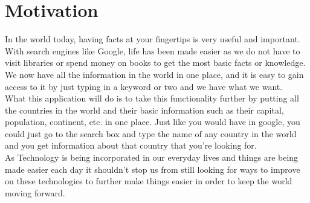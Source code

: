 \documentclass[twoside, a4paper, 12pt]{report}
\begin{document}
\section{Motivation}
In the world today, having facts at your fingertips is very useful and important. With search engines like Google, life has been made easier as we do not have to visit libraries or spend money on books to get the most basic facts or knowledge. We now have all the information in the world in one place, and it is easy to gain access to it by just typing in a keyword or two and we have what we want.\\
\indent
What this application will do is to take this functionality further by putting all the countries in the world and their basic information such as their capital, population, continent, etc. in one place. Just like you would have in google, you could just go to the search box and type the name of any country in the world and you get information about that country that you're looking for.\\
\indent
As Technology is being incorporated in our everyday lives and things are being made easier each day it shouldn't stop us from still looking for ways to improve on these technologies to further make things easier in order to keep the world moving forward.



\end{document}
